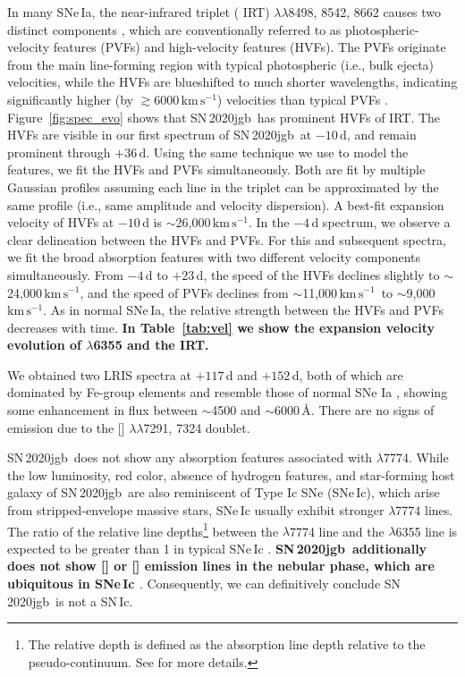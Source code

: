 \documentclass[twocolumn]{aastex631}
\newcommand{\sn}{SN\,2020jgb}
\newcommand{\kms}{$\mathrm{km}\,\mathrm{s}^{-1}$}
\newcommand{\revise}[1]{\textbf{#1}}
\begin{document}
In many SNe\,Ia, the  near-infrared triplet ( IRT) $\lambda\lambda$8498, 8542, 8662 causes two distinct components \citep{Mazzali_2005}, which are conventionally referred to as photospheric-velocity features (PVFs) and high-velocity features (HVFs). The PVFs originate from the main line-forming region with typical photospheric (i.e., bulk ejecta) velocities, while the HVFs are blueshifted to much shorter wavelengths, indicating significantly higher (by $\gtrsim$6000\,\kms) velocities than typical PVFs \citep{Silverman_HVF_2015}. Figure~\ref{fig:spec_evo} shows that \sn\ has prominent HVFs of  IRT. The HVFs are visible in our first spectrum of \sn\ at $-10$\,d, and remain prominent through $+36$\,d. Using the same technique we use to model the  features, we fit the HVFs and PVFs simultaneously. Both are fit by multiple Gaussian profiles assuming each line in the triplet can be approximated by the same profile (i.e., same amplitude and velocity dispersion). A best-fit expansion velocity of HVFs at $-10$\,d is $\sim$26,000\,\kms. In the $-4$\,d spectrum, we observe a clear delineation between the HVFs and PVFs. For this and subsequent spectra, we fit the broad absorption features with two different velocity components simultaneously. From $-4$\,d to $+23$\,d, the speed of the HVFs declines slightly to $\sim$24,000\,\kms, and the speed of PVFs declines from $\sim$11,000\,\kms\ to $\sim$9,000\,\kms. As in normal SNe\,Ia, the relative strength between the HVFs and PVFs decreases with time. \revise{In Table~\ref{tab:vel} we show the expansion velocity evolution of \ion{Si}{2} $\lambda$6355 and the \ion{Ca}{2} IRT.}



We obtained two LRIS spectra at $+117$\,d and $+152$\,d, both of which are dominated by Fe-group elements and resemble those of normal SNe Ia \citep[e.g., SN\,2011fe;][]{Mazzali_2015}, showing some enhancement in flux between $\sim$4500 and $\sim$6000\,\AA. There are no signs of emission due to the [] $\lambda\lambda$7291, 7324 doublet.

\sn\ does not show any absorption features associated with  $\lambda$7774. While the low luminosity, red color, absence of hydrogen features, and star-forming host galaxy of \sn\ are also reminiscent of Type Ic SNe (SNe\,Ic), which arise from stripped-envelope massive stars, SNe\,Ic usually exhibit stronger  $\lambda$7774 lines. The ratio of the relative line depths\footnote{The relative depth is defined as the absorption line depth relative to the pseudo-continuum. See \citet{Sun_2017} for more details.} between the  $\lambda$7774 line and the  $\lambda$6355 line is expected to be greater than 1 in typical SNe\,Ic \citep{Sun_2017, Gal-Yam_2017}. \revise{\sn\ additionally does not show [] or [\ion{Ca}{2}] emission lines in the nebular phase, which are ubiquitous in SNe\,Ic \citep{Jerkstrand_2017}}. Consequently, we can definitively conclude \sn\ is not a SN\,Ic.
\end{document}
